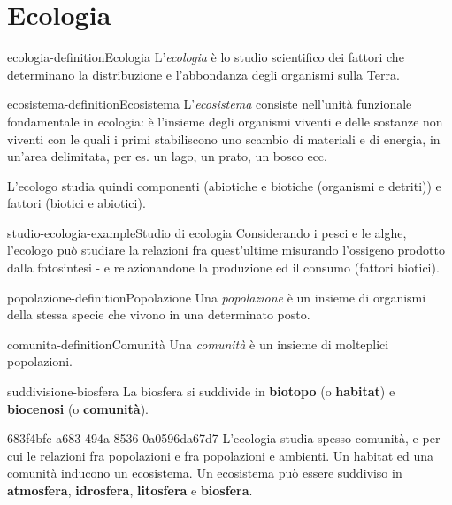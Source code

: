 \documentclass[preview]{standalone}
\begin{document}
\genpage

\section{Ecologia}

\begin{snippetdefinition}{ecologia-definition}{Ecologia}
    L'\textit{ecologia} è lo studio scientifico dei fattori che determinano la
    distribuzione e l'abbondanza degli organismi sulla Terra.
\end{snippetdefinition}

\begin{snippetdefinition}{ecosistema-definition}{Ecosistema}
    L'\textit{ecosistema} consiste nell'unità funzionale fondamentale in ecologia: è
    l'insieme degli organismi viventi e delle sostanze non viventi
    con le quali i primi stabiliscono uno scambio di materiali e di
    energia, in un'area delimitata, per es. un lago, un prato, un
    bosco ecc.
\end{snippetdefinition}

\begin{plainhtml}
    L'ecologo studia quindi componenti (abiotiche e biotiche (organismi e detriti)) e fattori
    (biotici e abiotici).
\end{plainhtml}

\begin{snippetexample}{studio-ecologia-example}{Studio di ecologia}
    Considerando i pesci e le alghe, l'ecologo può studiare la relazioni fra
    quest'ultime misurando l'ossigeno prodotto dalla fotosintesi - e relazionandone
    la produzione ed il consumo (fattori biotici).
\end{snippetexample}

\begin{snippetdefinition}{popolazione-definition}{Popolazione}
    Una \textit{popolazione} è un insieme di organismi della stessa
    specie che vivono in una determinato posto.
\end{snippetdefinition}

\begin{snippetdefinition}{comunita-definition}{Comunità}
    Una \textit{comunità} è un insieme di molteplici popolazioni.
\end{snippetdefinition}


\begin{snippet}{suddivisione-biosfera}
    La biosfera si suddivide in \textbf{biotopo} (o \textbf{habitat}) e \textbf{biocenosi} (o \textbf{comunità}).
\end{snippet}

\begin{snippet}{683f4bfc-a683-494a-8536-0a0596da67d7}
    L'ecologia studia spesso comunità, e per cui le relazioni fra popolazioni e fra popolazioni
    e ambienti. Un habitat ed una comunità inducono un ecosistema.
    Un ecosistema può essere suddiviso in \textbf{atmosfera}, \textbf{idrosfera}, \textbf{litosfera}
    e \textbf{biosfera}.
\end{snippet}
\end{document}
